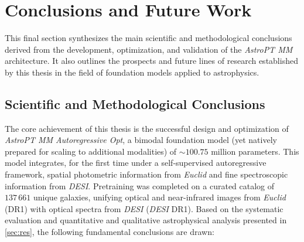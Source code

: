 
\section{Conclusions and Future Work} \label{sec:concl}

This final section synthesizes the main scientific and methodological conclusions derived from the development, optimization, and validation of the \textit{AstroPT MM} architecture. It also outlines the prospects and future lines of research established by this thesis in the field of foundation models applied to astrophysics.

\subsection{Scientific and Methodological Conclusions} \label{sec:concl:sci}

The core achievement of this thesis is the successful design and optimization of \textit{AstroPT MM Autoregressive Opt}, a bimodal foundation model (yet natively prepared for scaling to additional modalities) of $\sim 100.75$ million parameters. This model integrates, for the first time under a self-supervised autoregressive framework, spatial photometric information from \textit{Euclid} and fine spectroscopic information from \textit{\gls{DESI}}. Pretraining was completed on a curated catalog of $137\,661$ unique galaxies, unifying optical and near-infrared images from \textit{Euclid} (DR1) with optical spectra from \textit{\gls{DESI}} (\textit{\gls{DESI}} DR1). Based on the systematic evaluation and quantitative and qualitative astrophysical analysis presented in \cref{sec:res}, the following fundamental conclusions are drawn:

